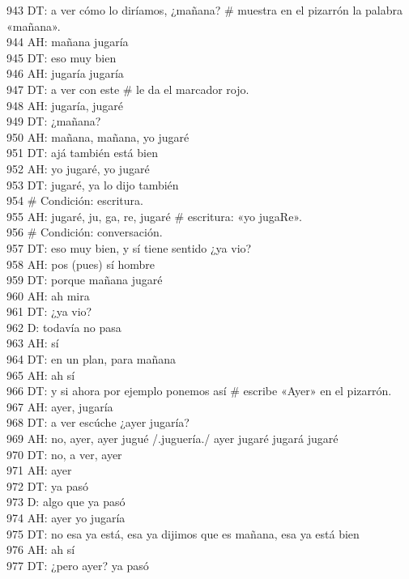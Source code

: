 943 DT: a ver cómo lo diríamos, ¿mañana? \# muestra en el pizarrón la palabra «mañana».\\
944 AH: mañana jugaría\\
945 DT: eso muy bien\\
946 AH: jugaría jugaría\\
947 DT: a ver con este \# le da el marcador rojo.\\
948 AH: jugaría, jugaré\\
949 DT: ¿mañana?\\
950 AH: mañana, mañana, yo jugaré\\
951 DT: ajá también está bien\\
952 AH: yo jugaré, yo jugaré\\
953 DT: jugaré, ya lo dijo también\\
954 \# Condición: escritura.\\
955 AH: jugaré, ju, ga, re, jugaré \# escritura: «yo jugaRe».\\
956 \# Condición: conversación.\\
957 DT: eso muy bien, y sí tiene sentido ¿ya vio?\\
958 AH: pos (pues) sí hombre\\
959 DT: porque mañana jugaré\\
960 AH: ah mira\\
961 DT: ¿ya vio?\\
962 D: todavía no pasa\\
963 AH: sí\\
964 DT: en un plan, para mañana\\
965 AH: ah sí\\
966 DT: y si ahora por ejemplo ponemos así \# escribe «Ayer» en el pizarrón.\\
967 AH: ayer, jugaría\\
968 DT: a ver escúche ¿ayer jugaría?\\
969 AH: no, ayer, ayer jugué /.juguería./ ayer jugaré jugará jugaré\\
970 DT: no, a ver, ayer\\
971 AH: ayer\\
972 DT: ya pasó\\
973 D: algo que ya pasó\\
974 AH: ayer yo jugaría\\
975 DT: no esa ya está, esa ya dijimos que es mañana, esa ya está bien\\
976 AH: ah sí\\
977 DT: ¿pero ayer? ya pasó\\
